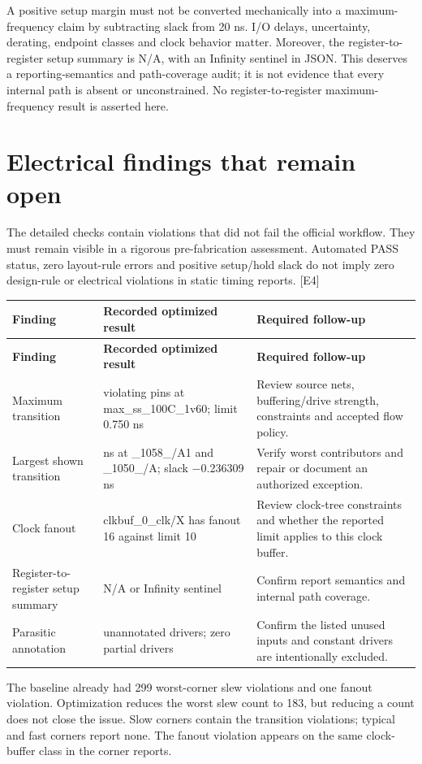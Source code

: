 \documentclass[10pt,letterpaper]{article}
\begin{document}
A positive setup margin must not be converted mechanically into a maximum-frequency claim by subtracting slack from 20 ns. I/O delays, uncertainty, derating, endpoint classes and clock behavior matter. Moreover, the register-to-register setup summary is N/A, with an Infinity sentinel in JSON. This deserves a reporting-semantics and path-coverage audit; it is not evidence that every internal path is absent or unconstrained. No register-to-register maximum-frequency result is asserted here.

\clearpage
\section{Electrical findings that remain open}
The detailed checks contain violations that did not fail the official workflow. They must remain visible in a rigorous pre-fabrication assessment. Automated PASS status, zero layout-rule errors and positive setup/hold slack do not imply zero design-rule or electrical violations in static timing reports. [E4]

{\small\begin{longtable}{>{\raggedright\arraybackslash}p{0.242647\dimexpr\linewidth-6\tabcolsep\relax}>{\raggedright\arraybackslash}p{0.404412\dimexpr\linewidth-6\tabcolsep\relax}>{\raggedright\arraybackslash}p{0.352941\dimexpr\linewidth-6\tabcolsep\relax}}\toprule
\textbf{Finding} & \textbf{Recorded optimized result} & \textbf{Required follow-up}\\\midrule\endfirsthead\textbf{Finding} & \textbf{Recorded optimized result} & \textbf{Required follow-up}\\\midrule\endhead
Maximum transition & 183 violating pins at max\_ss\_100C\_1v60; limit 0.750 ns & Review source nets, buffering/drive strength, constraints and accepted flow policy.\\
Largest shown transition & 0.986309 ns at \_1058\_/A1 and \_1050\_/A; slack \ensuremath{-}0.236309 ns & Verify worst contributors and repair or document an authorized exception.\\
Clock fanout & clkbuf\_0\_clk/X has fanout 16 against limit 10 & Review clock-tree constraints and whether the reported limit applies to this clock buffer.\\
Register-to-register setup summary & N/A or Infinity sentinel & Confirm report semantics and internal path coverage.\\
Parasitic annotation & 17 unannotated drivers; zero partial drivers & Confirm the listed unused inputs and constant drivers are intentionally excluded.\\
\bottomrule\end{longtable}}
The baseline already had 299 worst-corner slew violations and one fanout violation. Optimization reduces the worst slew count to 183, but reducing a count does not close the issue. Slow corners contain the transition violations; typical and fast corners report none. The fanout violation appears on the same clock-buffer class in the corner reports.
\end{document}
